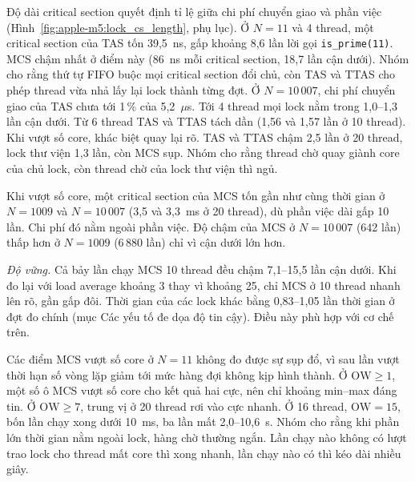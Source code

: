 Độ dài critical section quyết định tỉ lệ giữa chi phí chuyển giao và phần việc
(Hình~\ref{fig:apple-m5:lock_cs_length}, phụ lục). Ở $N = 11$ và 4 thread, một critical section của TAS tốn
39,5~ns, gấp khoảng 8,6 lần lời gọi \texttt{is\_prime(11)}. MCS chậm nhất ở điểm này (86~ns mỗi
critical section, 18,7 lần cận dưới). Nhóm cho rằng thứ tự FIFO buộc mọi critical section đổi chủ, còn
TAS và TTAS cho phép thread vừa nhả lấy lại lock thành từng đợt. Ở $N = 10\,007$, chi phí chuyển giao của
TAS chưa tới 1\,\% của 5,2~$\mu$s. Tới 4 thread mọi lock nằm trong 1,0--1,3 lần cận dưới. Từ 6 thread
TAS và TTAS tách dần (1,56 và 1,57 lần ở 10 thread). Khi vượt số core, khác biệt quay lại rõ. TAS và
TTAS chậm 2,5 lần ở 20 thread, lock thư viện 1,3 lần, còn MCS sụp. Nhóm cho rằng thread chờ quay giành core của
chủ lock, còn thread chờ của lock thư viện thì ngủ.

Khi vượt số core, một critical section của MCS tốn gần như cùng thời gian ở $N = 1009$ và
$N = 10\,007$ (3,5 và 3,3~ms ở 20 thread), dù phần việc dài gấp 10 lần. Chi phí đó nằm ngoài phần việc.
Độ chậm của MCS ở $N = 10\,007$ (642 lần) thấp hơn ở $N = 1009$ (6\,880 lần) chỉ vì cận dưới lớn hơn.

\emph{Độ vững.} Cả bảy lần chạy MCS 10 thread đều chậm 7,1--15,5 lần cận dưới. Khi đo lại với load
average khoảng 3 thay vì khoảng 25, chỉ MCS ở 10 thread nhanh lên rõ, gần gấp đôi. Thời gian của các
lock khác bằng 0,83--1,05 lần thời gian ở đợt đo chính (mục Các yếu tố đe dọa độ tin cậy). Điều này phù hợp với cơ chế trên.

Các điểm MCS vượt số core ở $N = 11$ không đo được sự sụp đổ, vì sau lần vượt thời hạn số vòng lặp giảm
tới mức hàng đợi không kịp hình thành. Ở $\mathrm{OW} \ge 1$, một số ô MCS vượt số core cho
kết quả hai cực, nên chỉ khoảng min--max đáng tin. Ở $\mathrm{OW} \ge 7$, trung vị ở 20 thread rơi vào cực
nhanh. Ở 16 thread, $\mathrm{OW} = 15$, bốn lần chạy xong dưới 10~ms, ba lần mất 2,0--10,6~s. Nhóm cho
rằng khi phần lớn thời gian nằm ngoài lock, hàng chờ thường ngắn. Lần chạy nào không có lượt trao lock
cho thread mất core thì xong nhanh, lần chạy nào có thì kéo dài nhiều giây.

